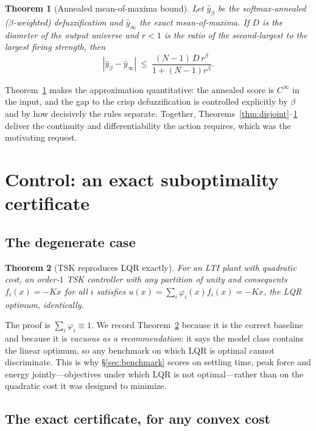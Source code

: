 \documentclass[11pt]{article}
\theoremstyle{plain}
\newtheorem{theorem}{Theorem}
\theoremstyle{definition}
\begin{document}
\begin{theorem}[Annealed mean-of-maxima bound]
\label{thm:anneal}
Let $\hat y_\beta$ be the softmax-annealed ($\beta$-weighted) defuzzification
and $\hat y_\infty$ the exact mean-of-maxima. If $D$ is the diameter of the
output universe and $r<1$ is the ratio of the second-largest to the largest
firing strength, then
\begin{equation}
|\hat y_\beta-\hat y_\infty|\ \le\
\frac{(N-1)\,D\,r^{\beta}}{1+(N-1)r^{\beta}} .
\end{equation}
\end{theorem}

Theorem~\ref{thm:anneal} makes the approximation quantitative: the annealed
score is $C^{\infty}$ in the input, and the gap to the crisp defuzzification is
controlled explicitly by $\beta$ and by how decisively the rules separate.
Together, Theorems~\ref{thm:disjoint}--\ref{thm:anneal} deliver the continuity
and differentiability the action requires, which was the motivating request.

\section{Control: an exact suboptimality certificate}
\label{sec:control}

\subsection{The degenerate case}

\begin{theorem}[TSK reproduces LQR exactly]
\label{thm:c1}
For an LTI plant with quadratic cost, an order-$1$ TSK controller with any
partition of unity and consequents $f_i(x)=-Kx$ for all $i$ satisfies
$u(x)=\sum_i\varphi_i(x)f_i(x)=-Kx$, the LQR optimum, identically.
\end{theorem}

The proof is $\sum_i\varphi_i\equiv1$. We record Theorem~\ref{thm:c1} because
it is the correct baseline and because it is \emph{vacuous as a recommendation}:
it says the model class contains the linear optimum, so any benchmark on which
LQR is optimal cannot discriminate. This is why \S\ref{sec:benchmark} scores on
settling time, peak force and energy jointly---objectives under which LQR is
not optimal---rather than on the quadratic cost it was designed to minimize.

\subsection{The exact certificate, for any convex cost}
\end{document}

